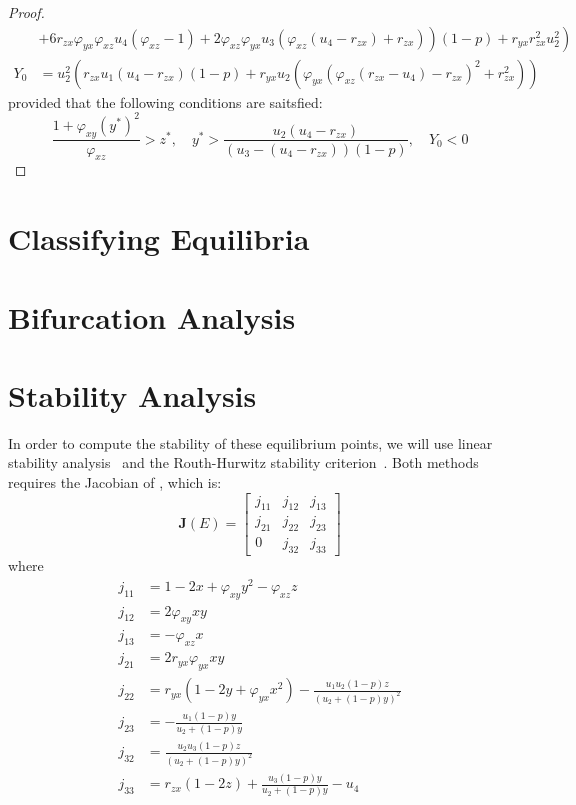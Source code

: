 \begin{proof}
\begin{align*}
        &\left.\left.+6r_{zx}\varphi_{yx}\varphi_{xz}u_4\left(\varphi_{xz}-1\right)+2\varphi_{xz}\varphi_{yx}u_3\left(\varphi_{xz}\left(u_4-r_{zx}\right)+r_{zx}\right)\right)\left(1-p\right)+r_{yx}r_{zx}^2u_2^2 \right)\\
        Y_0 &= u_2^2\left(r_{zx}u_1\left(u_4-r_{zx}\right)\left(1-p\right)+r_{yx}u_2\left(\varphi_{yx}\left(\varphi_{xz}\left(r_{zx}-u_4\right)-r_{zx}\right)^2+r_{zx}^2\right)\right)
    \end{align*}
    provided that the following conditions are saitsfied:
    \begin{equation*}
        \frac{1+\varphi_{xy}\left(y^*\right)^2}{\varphi_{xz}}>z^*,\quad
        y^*>\frac{u_2\left(u_4-r_{zx}\right)}{\left(u_3-\left(u_4-r_{zx}\right)\right)\left(1-p\right)},\quad
        Y_0 < 0
    \end{equation*}
\end{proof}

\section{Classifying Equilibria}
\section{Bifurcation Analysis}
\section{Stability Analysis}
In order to compute the stability of these equilibrium points, we will use linear stability analysis~\cite{Strogatz9780813349107} and the Routh-Hurwitz stability criterion~\cite{YANG2002615621}. Both methods requires the Jacobian of , which is:
\begin{equation}\label{matrix:jacobian-model}
    \textbf{J}\left(E\right) = \begin{bmatrix}
        j_{11} & j_{12} & j_{13}\\
        j_{21} & j_{22} & j_{23}\\
        0 & j_{32} & j_{33}
    \end{bmatrix}
\end{equation}
where
\begin{align*}
    j_{11} &= 1-2x+\varphi_{xy}y^2-\varphi_{xz}z\\
    j_{12} &= 2\varphi_{xy}xy\\
    j_{13} &= -\varphi_{xz}x\\
    j_{21} &= 2r_{yx}\varphi_{yx}xy\\
    j_{22} &= r_{yx}\left(1-2y+\varphi_{yx}x^2\right)-\frac{u_1u_2\left(1-p\right)z}{\left(u_2+\left(1-p\right)y\right)^2}\\
    j_{23} &= -\frac{u_1\left(1-p\right)y}{u_2+\left(1-p\right)y}\\
    j_{32} &= \frac{u_2u_3\left(1-p\right)z}{\left(u_2+\left(1-p\right)y\right)^2}\\
    j_{33} &= r_{zx}\left(1-2z\right)+\frac{u_3\left(1-p\right)y}{u_2+\left(1-p\right)y}-u_4
\end{align*}

